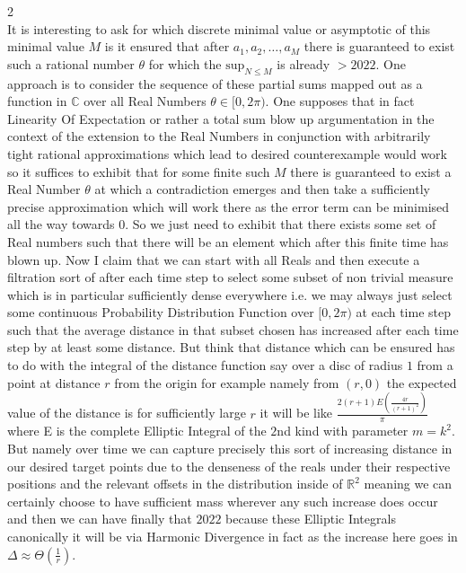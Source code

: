 2 \\
It is interesting to ask for which discrete minimal value or asymptotic of this minimal value $M$ is it ensured that after $a_1, a_2, \dots, a_M$ there is guaranteed to exist such a rational number $\theta$ for which the $\text{sup}_{N \le M}$ is already $> 2022$. One approach is to consider the sequence of these partial sums mapped out as a function in $\mathbb{C}$ over all Real Numbers $\theta \in [0,2 \pi)$. One supposes that in fact Linearity Of Expectation or rather a total sum blow up argumentation in the context of the extension to the Real Numbers in conjunction with arbitrarily tight rational approximations which lead to desired counterexample would work so it suffices to exhibit that for some finite such $M$ there is guaranteed to exist a Real Number $\theta$ at which a contradiction emerges and then take a sufficiently precise approximation which will work there as the error term can be minimised all the way towards $0$. So we just need to exhibit that there exists some set of Real numbers such that there will be an element which after this finite time has blown up. Now I claim that we can start with all Reals and then execute a filtration sort of after each time step to select some subset of non trivial measure which is in particular sufficiently dense everywhere i.e. we may always just select some continuous Probability Distribution Function over $[0,2 \pi)$ at each time step such that the average distance in that subset chosen has increased after each time step by at least some distance. But think that distance which can be ensured has to do with the integral of the distance function say over a disc of radius $1$ from a point at distance $r$ from the origin for example namely from $(r,0)$ the expected value of the distance is for sufficiently large $r$ it will be like $\frac{2(r+1) E \left( \frac{4r}{(r+1)^2} \right)}{\pi}$ where E is the complete Elliptic Integral of the $2$nd kind with parameter $m = k^2$. But namely over time we can capture precisely this sort of increasing distance in our desired target points due to the denseness of the reals under their respective positions and the relevant offsets in the distribution inside of $\mathbb{R}^2$ meaning we can certainly choose to have sufficient mass wherever any such increase does occur and then we can have finally that $2022$ because these Elliptic Integrals canonically it will be via Harmonic Divergence in fact as the increase here goes in $\Delta \approx \Theta \left( \frac{1}{r} \right)$.

